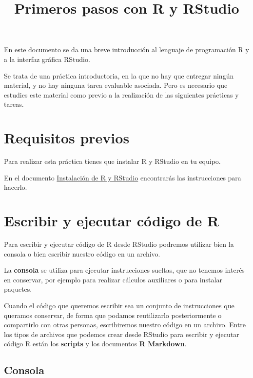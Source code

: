 \documentclass[
  degree=mecinf,
  title=normal,
  toc=normal,
  bib=normal]{mnye}
\title{Primeros pasos con R y RStudio}
\begin{document}

\hypertarget{section}{%
\section*{}\label{section}}

En este documento se da una breve introducción al lenguaje de programación \textsf{R} y a la interfaz gráfica \textsf{RStudio}.

Se trata de una práctica introductoria, en la que no hay que entregar ningún material, y no hay ninguna tarea evaluable asociada. Pero es necesario
que estudies este material como previo a la realización de las siguientes prácticas y tareas.

\hypertarget{prerequisites}{%
\section{Requisitos previos}\label{prerequisites}}

Para realizar esta práctica tienes que instalar \textsf{R} y \textsf{RStudio} en tu equipo.

En el documento \href{https://emazcunan.github.io/install-r-rstudio}{Instalación de R y RStudio} encontrarás las instrucciones para hacerlo.

\hypertarget{rmarkdown}{%
\section{Escribir y ejecutar código de R}\label{rmarkdown}}

Para escribir y ejecutar código de \textsf{R} desde \textsf{RStudio} podremos utilizar bien la consola o bien escribir nuestro código en un archivo.

La \textbf{consola} se utiliza para ejecutar instrucciones sueltas, que no tenemos interés en conservar, por ejemplo para realizar cálculos auxiliares o para instalar paquetes.

Cuando el código que queremos escribir sea un conjunto de instrucciones que queramos conservar, de forma que podamos reutilizarlo posteriormente o compartirlo con otras personas, escribiremos nuestro código en un archivo.
Entre los tipos de archivos que podemos crear desde \textsf{RStudio} para escribir y ejecutar código \textsf{R} están los \textbf{scripts} y los documentos \textbf{R Markdown}.

\hypertarget{consola}{%
\subsection{Consola}\label{consola}}
\end{document}
